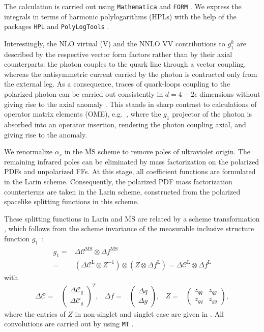 \documentclass[10pt,aps,prl,twocolumn,preprintnumbers,nofootinbib]{revtex4-2}
\newcommand{\Ccal}{\mathcal{C}}
\newcommand\MSbar{\overline{\mathrm{MS}}}
\newcommand{\Lar}{\mathrm{L}}
\begin{document}
The calculation is carried out using \texttt{Mathematica} and \texttt{FORM} \cite{Vermaseren:2000nd}. We express the integrals in terms of harmonic polylogarithms (HPLs) \cite{Remiddi:1999ew} with the help of the packages \texttt{HPL} \cite{Maitre:2005uu} and \texttt{PolyLogTools} \cite{Duhr:2019tlz}.

Interestingly, the NLO virtual (V) 
and the NNLO VV contributions to $g_1^h$ 
are described by the respective vector form factors \cite{Gehrmann:2005pd} rather than by their axial counterparts: 
the photon couples to the quark line through a vector coupling, whereas the antisymmetric current carried by the photon is contracted only from the external leg. As a consequence, traces of quark-loops coupling to the polarized photon can be carried out consistently in $d=4-2\epsilon$ dimensions without giving rise to the axial anomaly \cite{Adler:1969gk,Bell:1969ts}.
This stands in sharp contrast to calculations of operator matrix elements (OME), e.g.~\cite{Matiounine:1998re}, where the $g_1$ projector of the photon is absorbed into an operator insertion, rendering the photon coupling axial, and giving rise to the anomaly.

We renormalize $\alpha_s$ in the $\MSbar$ scheme to remove poles of 
ultraviolet origin. The remaining infrared poles can be eliminated by mass factorization 
on the polarized PDFs and unpolarized FFs. 
At this stage, all coefficient functions are formulated in the Larin scheme. Consequently, the polarized PDF mass factorization 
counterterms are taken
in the Larin scheme, constructed from the 
polarized spacelike splitting functions in this scheme. 

These splitting functions \cite{Mertig:1995ny,Vogelsang:1996im} in Larin and $\MSbar$ are related by a scheme transformation \cite{Zijlstra:1993sh}, which follows from the 
scheme 
invariance of the measurable inclusive structure function
$g_1$~\cite{Matiounine:1998re}:
\begin{align}
    g_1 =& \Delta \Ccal^{\MSbar} \otimes \Delta f^{\MSbar} \nonumber \\
    =& (\Delta \Ccal^{\Lar} \otimes Z^{-1}) \otimes ( Z \otimes \Delta f^{\Lar})
    = \Delta \Ccal^{\Lar} \otimes \Delta f^{\Lar}
\label{eq:scheme}
\end{align}
with 
\begin{align}
    \Delta \Ccal=& \begin{pmatrix}
        \Delta \Ccal_q\\
        \Delta \Ccal_g
    \end{pmatrix}^T, &
    \Delta f =& \begin{pmatrix}
        \Delta q \\
        \Delta g
    \end{pmatrix}, &
    Z =& \begin{pmatrix}
        z_{qq} & z_{qg} \\
        z_{gq} & z_{gg}
    \end{pmatrix},
\end{align}
where the entries of $Z$ in non-singlet and singlet case
are given in \cite{Moch:2014sna}. All convolutions are carried out by using \texttt{MT} \cite{Hoschele:2013pvt}.
\end{document}
